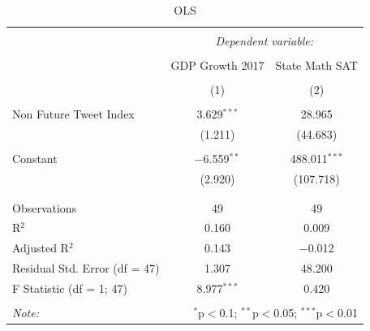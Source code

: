 \documentclass{article}
\begin{document}
\begin{table}[!htbp] \centering 
  \caption{OLS} 
  \label{} 
\begin{tabular}{@{\extracolsep{5pt}}lcc} 
\\[-1.8ex]\hline 
\hline \\[-1.8ex] 
 & \multicolumn{2}{c}{\textit{Dependent variable:}} \\ 
\cline{2-3} 
\\[-1.8ex] & GDP Growth 2017 & State Math SAT \\ 
\\[-1.8ex] & (1) & (2)\\ 
\hline \\[-1.8ex] 
 Non Future Tweet Index & 3.629$^{***}$ & 28.965 \\ 
  & (1.211) & (44.683) \\ 
  & & \\ 
 Constant & $-$6.559$^{**}$ & 488.011$^{***}$ \\ 
  & (2.920) & (107.718) \\ 
  & & \\ 
\hline \\[-1.8ex] 
Observations & 49 & 49 \\ 
R$^{2}$ & 0.160 & 0.009 \\ 
Adjusted R$^{2}$ & 0.143 & $-$0.012 \\ 
Residual Std. Error (df = 47) & 1.307 & 48.200 \\ 
F Statistic (df = 1; 47) & 8.977$^{***}$ & 0.420 \\ 
\hline 
\hline \\[-1.8ex] 
\textit{Note:}  & \multicolumn{2}{r}{$^{*}$p$<$0.1; $^{**}$p$<$0.05; $^{***}$p$<$0.01} \\ 
\end{tabular} 
\end{table} 
\end{document}

